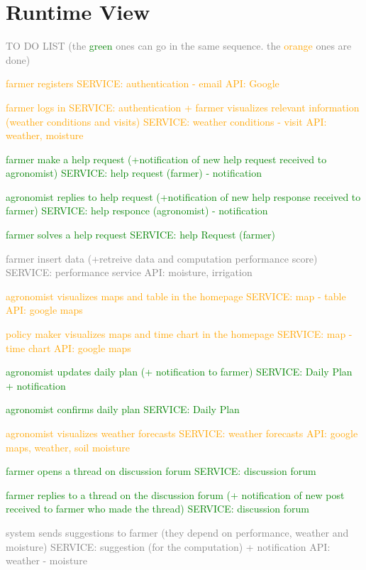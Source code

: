 \section{Runtime View}


\textcolor{gray}{TO DO LIST (the \textcolor{green} {green} ones can go in the same sequence. the \textcolor{orange}{orange} ones are done)
\begin{enumerate}
    \item \textcolor{orange}{farmer registers SERVICE: authentication - email API: Google}
    \item \textcolor{orange}{farmer logs in SERVICE: authentication + farmer visualizes relevant information (weather conditions and visits) SERVICE: weather conditions - visit API: weather, moisture}
    \textcolor{green}{
    \item farmer make a help request (+notification of new help request received to agronomist) SERVICE: help request (farmer) - notification
    \item agronomist replies to help request (+notification of new help response received to farmer) SERVICE: help responce (agronomist) - notification
    \item farmer solves a help request SERVICE: help Request (farmer)}
    \item farmer insert data (+retreive data and computation performance score) SERVICE: performance service API: moisture, irrigation
    \item \textcolor{orange}{agronomist visualizes maps and table in the homepage SERVICE: map - table API: google maps}
    \item \textcolor{orange}{policy maker visualizes maps and time chart in the homepage SERVICE: map - time chart API: google maps}
    \textcolor{green}{
    \item agronomist updates daily plan (+ notification to farmer) SERVICE: Daily Plan + notification
    \item agronomist confirms daily plan SERVICE: Daily Plan }
    \item \textcolor{orange}{agronomist visualizes weather forecasts SERVICE: weather forecasts API: google maps, weather, soil moisture }
    \textcolor{green}{
    \item farmer opens a thread on discussion forum SERVICE: discussion forum
    \item farmer replies to a thread on the discussion forum (+ notification of new post received to farmer who made the thread) SERVICE: discussion forum}
    \item system sends suggestions to farmer (they depend on performance, weather and moisture) SERVICE: suggestion (for the computation) + notification API: weather - moisture
\end{enumerate}
}

